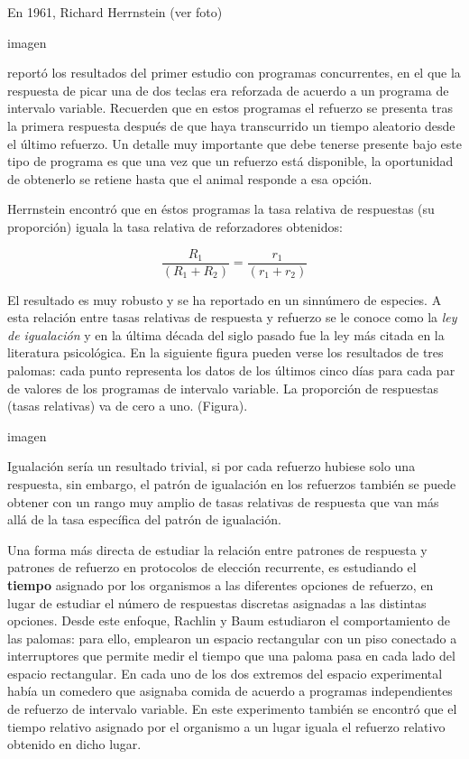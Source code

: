 \documentclass[
  letterpaper,
]{book}
\begin{document}
En 1961, Richard Herrnstein (ver foto)

imagen

reportó los resultados del primer estudio con programas concurrentes, en
el que la respuesta de picar una de dos teclas era reforzada de acuerdo
a un programa de intervalo variable. Recuerden que en estos programas el
refuerzo se presenta tras la primera respuesta después de que haya
transcurrido un tiempo aleatorio desde el último refuerzo. Un detalle
muy importante que debe tenerse presente bajo este tipo de programa es
que una vez que un refuerzo está disponible, la oportunidad de obtenerlo
se retiene hasta que el animal responde a esa opción.

Herrnstein encontró que en éstos programas la tasa relativa de
respuestas (su proporción) iguala la tasa relativa de reforzadores
obtenidos:

\[
\frac {R_1} {(R_1 + R_2)} = \frac {r_1} {(r_1 + r_2)}
\]

El resultado es muy robusto y se ha reportado en un sinnúmero de
especies. A esta relación entre tasas relativas de respuesta y refuerzo
se le conoce como la \emph{ley de igualación} y en la última década del
siglo pasado fue la ley más citada en la literatura psicológica. En la
siguiente figura pueden verse los resultados de tres palomas: cada punto
representa los datos de los últimos cinco días para cada par de valores
de los programas de intervalo variable. La proporción de respuestas
(tasas relativas) va de cero a uno. (Figura).

imagen

Igualación sería un resultado trivial, si por cada refuerzo hubiese solo
una respuesta, sin embargo, el patrón de igualación en los refuerzos
también se puede obtener con un rango muy amplio de tasas relativas de
respuesta que van más allá de la tasa específica del patrón de
igualación.

Una forma más directa de estudiar la relación entre patrones de
respuesta y patrones de refuerzo en protocolos de elección recurrente,
es estudiando el \textbf{tiempo} asignado por los organismos a las
diferentes opciones de refuerzo, en lugar de estudiar el número de
respuestas discretas asignadas a las distintas opciones. Desde este
enfoque, Rachlin y Baum estudiaron el comportamiento de las palomas:
para ello, emplearon un espacio rectangular con un piso conectado a
interruptores que permite medir el tiempo que una paloma pasa en cada
lado del espacio rectangular. En cada uno de los dos extremos del
espacio experimental había un comedero que asignaba comida de acuerdo a
programas independientes de refuerzo de intervalo variable. En este
experimento también se encontró que el tiempo relativo asignado por el
organismo a un lugar iguala el refuerzo relativo obtenido en dicho
lugar.
\end{document}
